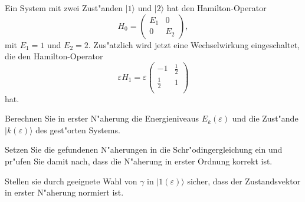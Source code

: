 Ein System mit zwei Zust"anden $|1\rangle$ und $|2\rangle$
hat den Hamilton-Operator
\[
H_0=\begin{pmatrix}
E_1&  0\\
  0&E_2
\end{pmatrix},
\]
mit $E_1=1$ und $E_2=2$.
Zus"atzlich wird jetzt eine Wechselwirkung eingeschaltet, die den
Hamilton-Operator
\[
\varepsilon H_1=
\varepsilon \begin{pmatrix}
     -1&\frac12\\
\frac12&      1\\
\end{pmatrix}
\]
hat.
\begin{teilaufgaben}
\item 
Berechnen Sie in erster N"aherung die Energieniveaus $E_k(\varepsilon)$
und die Zust"ande $|k(\varepsilon)\rangle$ des gest"orten Systems.
\item
Setzen Sie die gefundenen N"aherungen in die Schr"odingergleichung ein
und pr"ufen Sie damit nach, dass die N"aherung in erster Ordnung
korrekt ist.
\item 
Stellen sie durch geeignete Wahl von $\gamma$ in $|1(\varepsilon)\rangle$ 
sicher, dass der Zustandsvektor in erster N"aherung normiert ist.
\end{teilaufgaben}

